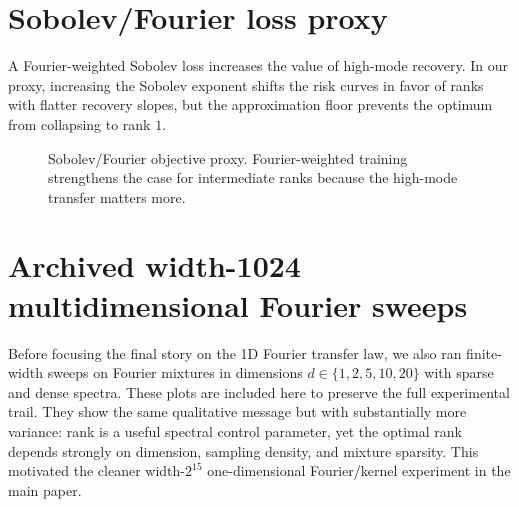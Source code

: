 \documentclass[10pt]{article}
\begin{document}
\section{Sobolev/Fourier loss proxy}
A Fourier-weighted Sobolev loss increases the value of high-mode recovery.  In our proxy, increasing the Sobolev exponent shifts the risk curves in favor of ranks with flatter recovery slopes, but the approximation floor prevents the optimum from collapsing to rank $1$.

\begin{figure}[t]
\centering
{}
\caption{Sobolev/Fourier objective proxy.  Fourier-weighted training strengthens the case for intermediate ranks because the high-mode transfer matters more.}
\label{fig:app_sobolev}
\end{figure}


\clearpage
\section{Archived width-1024 multidimensional Fourier sweeps}
Before focusing the final story on the 1D Fourier transfer law, we also ran finite-width sweeps on Fourier mixtures in dimensions $d\in\{1,2,5,10,20\}$ with sparse and dense spectra.  These plots are included here to preserve the full experimental trail.  They show the same qualitative message but with substantially more variance: rank is a useful spectral control parameter, yet the optimal rank depends strongly on dimension, sampling density, and mixture sparsity.  This motivated the cleaner width-$2^{15}$ one-dimensional Fourier/kernel experiment in the main paper.
\end{document}

